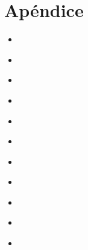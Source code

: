 \documentclass[letterpaper]{article}
\newcommand{\python}[2]{
    \begin{itemize}
        \item[]
    \end{itemize}
}
\begin{document}
\nocite{*}



\section{Apéndice}

\python{codigos/p1.py}{p1.py}
\python{codigos/p2.py}{p2.py}
\python{codigos/p3.py}{p3.py}
\python{codigos/p4.py}{p4.py}
\python{codigos/p5-1-gnutella.py}{p5-1-gnutella.py}
\python{codigos/p5-2-delfines.py}{p5-2-delfines.py}
\python{codigos/p5-3-erdos-renyi-gnutella.py}{p5-3-erdos-renyi-gnutella.py}
\python{codigos/p5-4-erdos-renyi-delfines.py}{p5-3-erdos-renyi-delfines.py}
\python{codigos/p7.py}{p7.py}
\python{codigos/p8.py}{p8.py}
\python{codigos/p9.py}{p9.py}
\end{document}
